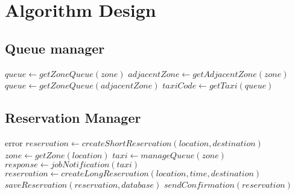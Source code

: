 \section{Algorithm Design}
\subsection{Queue manager}
\begin{algorithmic}
		\State $queue\gets getZoneQueue(zone)$
				\State $adjacentZone \gets getAdjacentZone(zone)$
				\State $queue\gets getZoneQueue(adjacentZone)$
		\EndWhile
		\State $taxiCode \gets getTaxi(queue)$
		\State {}
	\EndFunction
\end{algorithmic}
\subsection{Reservation Manager}
\begin{algorithmic}
			\State \Return error 
		\EndIf
			\State $reservation \gets createShortReservation(location, destination)$
			\State $zone \gets getZone(location)$
				\State $taxi \gets manageQueue(zone)$
				\State $response \gets jobNotification(taxi)$
			\EndWhile	
		\Else 
			\State $reservation \gets createLongReservation(location, time, destination)$
			\State $saveReservation(reservation, database)$
			\State \Return
		\EndIf
		\State $sendConfirmation(reservation)$
		\State \Return
	\EndFunction
\end{algorithmic}